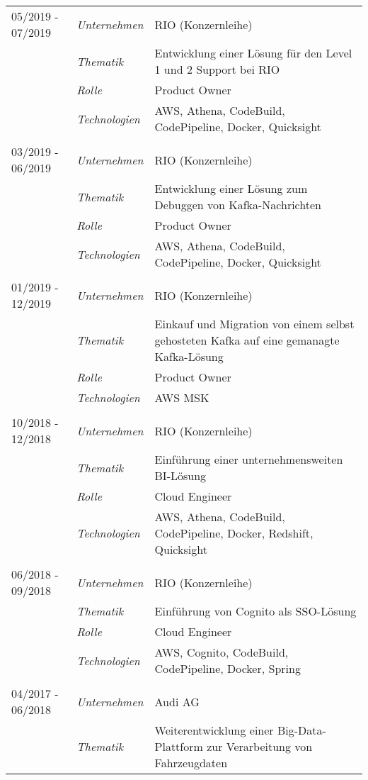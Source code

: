 \begin{longtable}{@{}>{}p{4cm}>{\itshape}p{2cm}>{}p{9cm}}
05/2019 - 07/2019 & Unternehmen   & RIO (Konzernleihe)\\
\nopagebreak		& Thematik	    & Entwicklung einer Lösung für den Level 1 und 2 Support bei RIO\\
\nopagebreak		& Rolle 	      & Product Owner\\
\nopagebreak		& Technologien	& AWS, Athena, CodeBuild, CodePipeline, Docker, Quicksight\\
\\
03/2019 - 06/2019 & Unternehmen   & RIO (Konzernleihe)\\
\nopagebreak		& Thematik	    & Entwicklung einer Lösung zum Debuggen von Kafka-Nachrichten\\
\nopagebreak		& Rolle 	      & Product Owner\\
\nopagebreak		& Technologien	& AWS, Athena, CodeBuild, CodePipeline, Docker, Quicksight\\
\\
01/2019 - 12/2019 & Unternehmen   & RIO (Konzernleihe)\\
\nopagebreak		& Thematik	    & Einkauf und Migration von einem selbst gehosteten Kafka auf eine gemanagte Kafka-Lösung\\
\nopagebreak		& Rolle 	      & Product Owner\\
\nopagebreak		& Technologien	& AWS MSK\\
\\
10/2018 - 12/2018 & Unternehmen & RIO (Konzernleihe)\\
\nopagebreak		& Thematik	    & Einführung einer unternehmensweiten BI-Lösung\\
\nopagebreak		& Rolle 	      & Cloud Engineer\\
\nopagebreak		& Technologien	& AWS, Athena, CodeBuild, CodePipeline, Docker, Redshift, Quicksight\\
\\
06/2018 - 09/2018     & Unternehmen   & RIO (Konzernleihe)\\
\nopagebreak		& Thematik	    & Einführung von Cognito als SSO-Lösung\\
\nopagebreak		& Rolle 	      & Cloud Engineer\\
\nopagebreak		& Technologien	& AWS, Cognito, CodeBuild, CodePipeline, Docker, Spring\\
\\
04/2017 - 06/2018     & Unternehmen   & Audi AG\\
\nopagebreak		& Thematik	    & Weiterentwicklung einer Big-Data-Plattform zur Verarbeitung von Fahrzeugdaten\\

\end{longtable}
